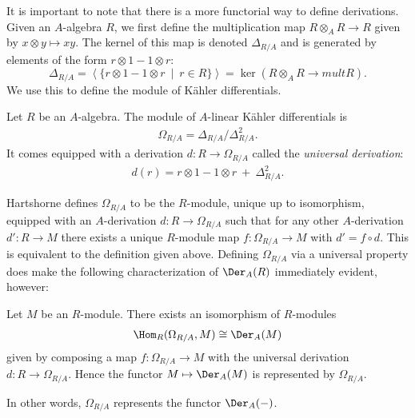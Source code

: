 It is important to note that there is a more functorial way to define derivations. Given an $A$-algebra $R$, we first define the multiplication map $R\otimes_A R\to R$ given by $x\otimes y\mapsto xy$. The kernel of this map is denoted $\Delta_{R/A}$ and is generated by elements of the form $r\otimes 1 - 1\otimes r$:
\begin{equation}\label{eqn:delta-module}
	\Delta_{R/A} = \left\langle \{r\otimes 1 - 1\otimes r ~\mid~ r\in R\} \right\rangle = \ker(R\otimes_A R \to{mult} R).
\end{equation}
We use this to define the module of K\"ahler differentials.
\begin{defn}\label{defn:kahler-diff}
	Let $R$ be an $A$-algebra. The module of $A$-linear K\"ahler differentials is
	\begin{align*}
		\Omega_{R/A} = \Delta_{R/A}/\Delta_{R/A}^2.
	\end{align*}
	It comes equipped with a derivation $d:R\to \Omega_{R/A}$ called the \emph{universal derivation}:
	\begin{align*}
		d(r) = r \otimes 1 - 1\otimes r ~+~ \Delta_{R/A}^2.
	\end{align*}
\end{defn}
Hartshorne defines $\Omega_{R/A}$ to be the $R$-module, unique up to isomorphism, equipped with an $A$-derivation $d:R\to \Omega_{R/A}$ such that for any other $A$-derivation $d':R\to M$ there exists a unique $R$-module map $f:\Omega_{R/A} \to M$ with $d' = f\circ d$. This is equivalent to the definition given above. Defining $\Omega_{R/A}$ via a universal property does make the following characterization of $\Der_A(R)$ immediately evident, however:
\begin{prop}\label{prop:derivation-characterization}
	Let $M$ be an $R$-module. There exists an isomorphism of $R$-modules
	\begin{align*}
		\Hom_R(\Omega_{R/A},M) \cong \Der_A(M)
	\end{align*}
	given by composing a map $f:\Omega_{R/A}\to M$ with the universal derivation $d:R\to \Omega_{R/A}$. Hence the functor $M\mapsto \Der_A(M)$ is represented by $\Omega_{R/A}$.
\end{prop}
\noindent In other words, $\Omega_{R/A}$ represents the functor $\Der_A(-)$.
